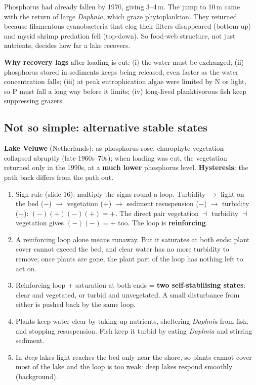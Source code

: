 \begin{chain}
Phosphorus had already fallen by 1970, giving 3--4\,m. The jump to 10\,m came with the return of large \emph{Daphnia},
which graze phytoplankton. They returned because filamentous cyanobacteria that clog their filters disappeared
(bottom-up) and mysid shrimp predation fell (top-down). So food-web structure, not just nutrients, decides how far a
lake recovers.
\end{chain}

\textbf{Why recovery lags} after loading is cut: (i) the water must be exchanged; (ii) phosphorus stored in sediments keeps
being released, even faster as the water concentration falls; (iii) at peak eutrophication algae were limited by N or
light, so P must fall a long way before it limits; (iv) long-lived planktivorous fish keep suppressing grazers.

\subsection{Not so simple: alternative stable states}
\textbf{Lake Veluwe} (Netherlands): as phosphorus rose, charophyte vegetation collapsed abruptly (late 1960s--70s); when
loading was cut, the vegetation returned only in the 1990s, at a \textbf{much lower} phosphorus level.
\textbf{Hysteresis}: the path back differs from the path out.

\begin{chain}
\begin{enumerate}
\item Sign rule (slide 16): multiply the signs round a loop. Turbidity $\to$ light on the bed ($-$) $\to$ vegetation
($+$) $\to$ sediment resuspension ($-$) $\to$ turbidity ($+$): $(-)(+)(-)(+)=+$. The direct pair vegetation
$\dashv$ turbidity $\dashv$ vegetation gives $(-)(-)=+$ too. The loop is \textbf{reinforcing}.
\item A reinforcing loop alone means runaway. But it saturates at both ends: plant cover cannot exceed the bed, and
clear water has no more turbidity to remove; once plants are gone, the plant part of the loop has nothing left to act on.
\item Reinforcing loop + saturation at both ends = \textbf{two self-stabilising states}: clear and vegetated, or turbid
and unvegetated. A small disturbance from either is pushed back by the same loop.
\item Plants keep water clear by taking up nutrients, sheltering \emph{Daphnia} from fish, and stopping resuspension.
Fish keep it turbid by eating \emph{Daphnia} and stirring sediment.
\item In \emph{deep} lakes light reaches the bed only near the shore, so plants cannot cover most of the lake and the loop is
too weak: deep lakes respond smoothly (background).
\end{enumerate}
\end{chain}

